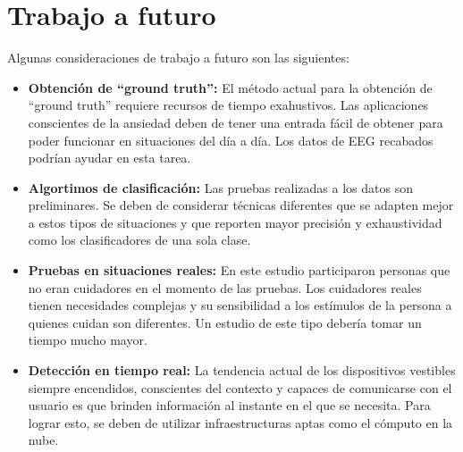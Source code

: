 \section{Trabajo a futuro}
Algunas consideraciones de trabajo a futuro son las siguientes:

\begin{itemize}
	\item \textbf{Obtenci\'on de ``ground truth'':} El m\'etodo actual para la obtenci\'on de ``ground truth'' requiere recursos de tiempo exahustivos. Las aplicaciones conscientes de la ansiedad deben de tener una entrada f\'acil de obtener para poder funcionar en situaciones del d\'ia a d\'ia. Los datos de EEG recabados podr\'ian ayudar en esta tarea.

	\item \textbf{Algortimos de clasificaci\'on:} Las pruebas realizadas a los datos son preliminares. Se deben de considerar t\'ecnicas diferentes que se adapten mejor a estos tipos de situaciones y que reporten mayor precisi\'on y exhaustividad como los clasificadores de una sola clase.
	\item \textbf{Pruebas en situaciones reales:} En este estudio participaron personas que no eran cuidadores en el momento de las pruebas. Los cuidadores reales tienen necesidades complejas y su sensibilidad a los est\'imulos de la persona a quienes cuidan son diferentes. Un estudio de este tipo deber\'ia tomar un tiempo mucho mayor.
	\item \textbf{Detecci\'on en tiempo real:} La tendencia actual de los dispositivos vestibles siempre encendidos, conscientes del contexto y capaces de comunicarse con el usuario es que brinden informaci\'on al instante en el que se necesita. Para lograr esto, se deben de utilizar infraestructuras aptas como el c\'omputo en la nube.

\end{itemize}
